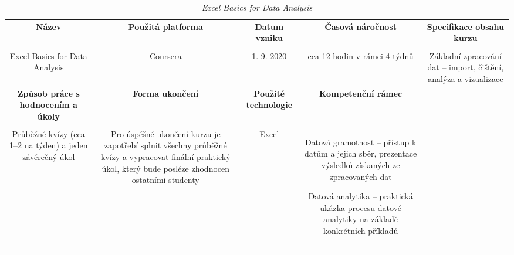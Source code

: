 \begin{landscape}

\begin{table}[htbp]

\renewcommand\thetable{7}

\caption{\textit{Excel Basics for Data Analysis}}\label{tab7}

\footnotesize

{

\justifying

\begin{tabularx}{\linewidth}{CCCCC}

\toprule

\textbf{Název} &

\textbf{Použitá platforma} &

\textbf{Datum vzniku} &

\textbf{Časová náročnost} &
 
\textbf{Specifikace obsahu kurzu}

\\

\tabularnewline
\midrule

Excel Basics for Data Analysis

&

Coursera

&

1. 9. 2020

&

cca 12 hodin v rámci 4 týdnů

&

Základní zpracování dat – import, čištění, analýza a vizualizace

\\
\toprule

\textbf{Způsob práce s hodnocením a úkoly} &

\textbf{Forma ukončení} &

\textbf{Použité technologie} &

\textbf{Kompetenční rámec} 

\\

\tabularnewline
\midrule

Průběžné kvízy (cca 1–2 na týden) a jeden závěrečný úkol    

&

Pro úspěšné ukončení kurzu je zapotřebí splnit všechny průběžné kvízy a vypracovat finální praktický úkol, který bude posléze zhodnocen ostatními studenty

&

Excel

&

Datová gramotnost – přístup k datům a jejich sběr, prezentace výsledků získaných ze zpracovaných dat

Datová analytika – praktická ukázka procesu datové analytiky na základě konkrétních příkladů   

\\

\tabularnewline
\bottomrule
\end{tabularx}

}

\end{table}

\end{landscape}